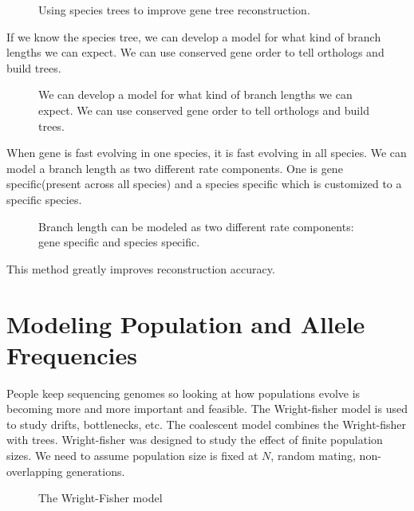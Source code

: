\begin{figure}[ht!]
  \centering
  \caption{Using species trees to improve gene tree reconstruction.} 
  \label{Fig10_LearningAcrossGeneTrees}
\end{figure}

If we know the species tree, we can develop a model for what kind of
branch lengths we can expect. We can use conserved gene order to tell
orthologs and build trees.

\begin{figure}[ht!]
  \centering
  \caption{We can develop a model for what kind of branch lengths we
    can expect. We can use conserved gene order to tell orthologs and
    build trees.}
  \label{Fig11_DevelopingRatesModel}
\end{figure}

When gene is fast evolving in one species, it is fast evolving in all
species. We can model a branch length as two different rate
components. One is gene specific(present across all species) and a
species specific which is customized to a specific species.

\begin{figure} [ht!] 
  \centering
  \caption{Branch length can be modeled as two different rate
    components: gene specific and species specific.}
  \label{Fig12_UsingRateModels}
\end{figure} 

\noindent This method greatly improves reconstruction accuracy.

\section{Modeling Population and Allele Frequencies}
People keep sequencing genomes so looking at how populations evolve is
becoming more and more important and feasible. The Wright-fisher model
is used to study drifts, bottlenecks, etc. The coalescent model
combines the Wright-fisher with trees. Wright-fisher was designed to
study the effect of finite population sizes. We need to assume
population size is fixed at $N$, random mating, non-overlapping
generations.

\begin{figure} [ht!] 
  \centering 
  \caption{The Wright-Fisher model}
  \label{Fig13_FisherWrightModel}
\end{figure} 

